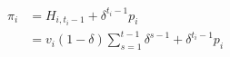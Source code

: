 \begin{align}
	\pi_i &= H_{i, t_i-1} + \delta^{t_i-1}p_i \\
	&= v_i(1-\delta)\sum_{s=1}^{t-1} \delta^{s-1} + \delta^{t_i-1}p_i  \label{eq:XiaoSPO}
\end{align}